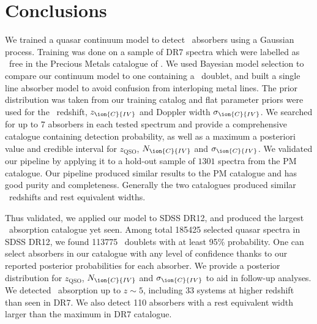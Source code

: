 \documentclass[fleqn,usenatbib]{mnras}
\newcommand{\civ}{\ion{C}{IV}}
\newcommand{\nciv}{N_{\civ}} %
\newcommand{\zciv}{z_{\civ}}
\newcommand{\sciv}{\sigma_{\civ}}
\newcommand{\zqso}{z_{\textrm{QSO}}}
\begin{document}
\section{Conclusions}
\label{sec:summary}
We trained a quasar continuum model to detect \civ~absorbers using a Gaussian process. Training was done on a sample of DR7 spectra which were labelled as \civ~free in the Precious Metals catalogue of \cite{C13}. We used Bayesian model selection to compare our continuum model to one containing a \civ~doublet, and built a single line absorber model to avoid confusion from interloping metal lines.
The prior distribution was taken from our training catalog and flat parameter priors were used for the \civ~redshift, $\zciv$ and Doppler width $\sciv$. We searched for up to 7 absorbers in each tested spectrum and provide a comprehensive catalogue containing detection probability, as well as a maximum a posteriori value and credible interval for $\zqso$, $\nciv$ and $\sciv$. We validated our pipeline by applying it to a hold-out sample of $1301$ spectra from the PM catalogue. Our pipeline produced similar results to the PM catalogue and has good purity and completeness. Generally the two catalogues produced similar \civ~redshifts and rest equivalent widths.

Thus validated, we applied our model to SDSS DR12, and produced the largest \civ\ absorption catalogue yet seen. Among total 185425 selected quasar spectra in SDSS DR12, we found 113775
\civ\ doublets with at least 95\% probability. One can select absorbers in our catalogue with any level
of confidence thanks to our reported posterior probabilities for 
each absorber. We provide a posterior distribution for 
$\zqso$, $\nciv$ and $\sciv$ to aid in follow-up analyses. 
We detected \civ~absorption up to $z \sim 5$, including $33$
 systems at higher redshift than seen in DR7. We also detect 110 absorbers 
 with a rest equivalent width larger than the maximum in DR7 catalogue.
\end{document}
